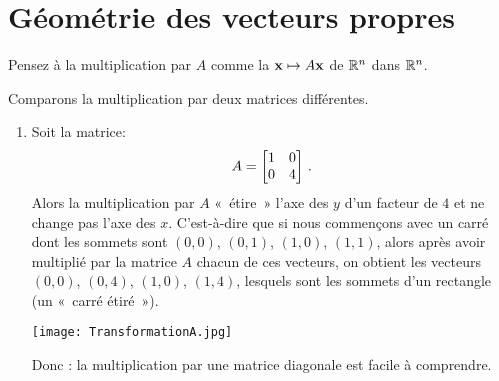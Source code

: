\section{Géométrie des vecteurs propres}

Pensez à la multiplication par $A$ comme la   $\mathbf{x}\mapsto A\mathbf{x}$ de 
$\mathbb{R}^n$ dans $\mathbb{R}^n$.  

\begin{myexample} Comparons la multiplication par deux matrices différentes.
\begin{enumerate}[(1)]
	\item Soit la matrice: 
$$A = \left[ \begin{matrix} 1 & 0 \\ 0 & 4 \end{matrix} \right]\,.$$
Alors la multiplication par $A$ «~étire~» l'axe des $y$ d'un facteur
de $4$ et ne change pas l'axe des $x$.  C'est-à-dire que si nous commençons avec un carré dont les
sommets sont $(0,0)$, $(0,1)$, $(1,0)$, $(1,1)$, 
alors après avoir multiplié par la matrice $A$ chacun de ces vecteurs, on obtient les vecteurs $(0,0)$, $(0,4)$, $(1,0)$, $(1,4)$,
lesquels sont les sommets d'un rectangle (un «~carré étiré~»).
\begin{center}
\texttt{[image: TransformationA.jpg]}
\end{center}
Donc : la multiplication par une matrice diagonale est facile à comprendre.


\end{enumerate}
\end{myexample}
